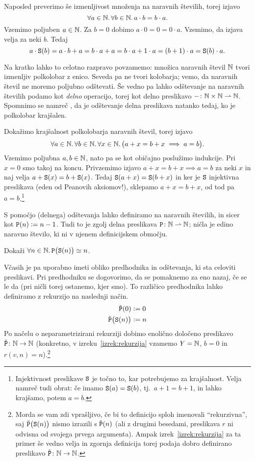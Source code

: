 Naposled preverimo še izmenljivost množenja na naravnih številih, torej izjavo
\[\forall a \in \mathbb{N} .\,\forall b \in \mathbb{N} .\,{a \cdot b = b \cdot a}.\]
Vzemimo poljuben $a \in \mathbb{N}$. Za $b = 0$ dobimo $a \cdot 0 = 0 = 0 \cdot a$. Vzemimo, da izjava velja za neki $b$. Tedaj
\[a \cdot \mathtt{S}(b) = a \cdot b + a = b \cdot a + a = b \cdot a + 1 \cdot a = (b + 1) \cdot a = \mathtt{S}(b) \cdot a.\]

Na kratko lahko to celotno razpravo povzamemo: množica naravnih števil $\mathbb{N}$ tvori izmenljiv polkolobar z enico.  Seveda pa ne tvori kolobarja; vemo, da naravnih števil ne moremo poljubno odštevati. Še vedno pa lahko odštevanje na naravnih številih podamo kot \emph{delno} operacijo, torej kot delno preslikavo $-\colon \mathbb{N} \times \mathbb{N} \mathrel{\rightharpoonup} \mathbb{N}$. Spomnimo se namreč , da je odštevanje delna preslikava natanko tedaj, ko je polkolobar krajšalen.

Dokažimo krajšalnost polkolobarja naravnih števil, torej izjavo
\[\forall a \in \mathbb{N} .\,\forall b \in \mathbb{N} .\,\forall x \in \mathbb{N} .\,\big(a + x = b + x \implies a = b\big).\]
Vzemimo poljubna $a, b \in \mathbb{N}$, nato pa se kot običajno poslužimo indukcije. Pri $x = 0$ smo takoj na koncu. Privzemimo izjavo $a + x = b + x \implies a = b$ za neki $x$ in naj velja $a + \mathtt{S}(x) = b + \mathtt{S}(x)$. Tedaj $\mathtt{S}(a + x) = \mathtt{S}(b + x)$ in ker je $\mathtt{S}$ injektivna preslikava (eden od Peanovih aksiomov!), sklepamo $a + x = b + x$, od tod pa $a = b$.\footnote{Injektivnost preslikave $\mathtt{S}$ je točno to, kar potrebujemo za krajšalnost. Velja namreč tudi obrat: če imamo $\mathtt{S}(a) = \mathtt{S}(b)$, tj.~$a + 1 = b + 1$, in lahko krajšamo, potem $a = b$.}

S pomočjo (delnega) odštevanja lahko definiramo  na naravnih številih, in sicer kot $\mathtt{P}(n) \mathrel{\mathop:}= n - 1$. Tudi to je zgolj delna preslikava $\mathtt{P}\colon \mathbb{N} \mathrel{\rightharpoonup} \mathbb{N}$; ničla je edino naravno število, ki ni v njenem definicijskem območju.

\begin{naloga}
Dokaži $\forall n \in \mathbb{N} .\,{\mathtt{P}\big(\mathtt{S}(n)\big) \simeq n}$.
\end{naloga}

Včasih je pa uporabno imeti obliko predhodnika in odštevanja, ki sta celoviti preslikavi. Pri predhodniku se dogovorimo, da se pomaknemo za eno nazaj, če se le da (pri ničli torej ostanemo, kjer smo). To različico predhodnika lahko definiramo z rekurzijo na naslednji način.
\begin{align*}
\tilde{\mathtt{P}}(0) &\mathrel{\mathop:}= 0 \\
\tilde{\mathtt{P}}\big(\mathtt{S}(n)\big) &\mathrel{\mathop:}= n
\end{align*}
Po načelu o neparametrizirani rekurziji dobimo enolično določeno preslikavo $\tilde{\mathtt{P}}\colon \mathbb{N} \to \mathbb{N}$ (konkretno, v izreku~\ref{izrek:rekurzija} vzamemo $Y = \mathbb{N}$, $b = 0$ in $r(v, n) = n$).\footnote{Morda se vam zdi vprašljivo, če bi to definicijo sploh imenovali ``rekurzivna'', saj $\tilde{\mathtt{P}}\big(\mathtt{S}(n)\big)$ nismo izrazili s $\tilde{\mathtt{P}}(n)$ (ali z drugimi besedami, preslikava $r$ ni odvisna od svojega prvega argumenta). Ampak izrek~\ref{izrek:rekurzija} za ta primer še vedno velja in zgornja definicija torej podaja dobro definirano preslikavo $\tilde{\mathtt{P}}\colon \mathbb{N} \to \mathbb{N}$.}

